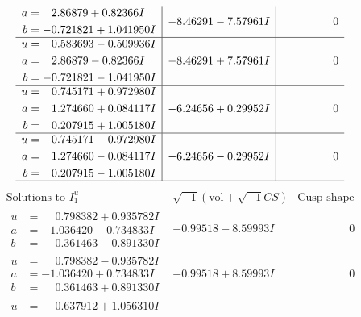 \documentclass[1p]{elsarticle_modified}
\theoremstyle{definition}
\newcommand{\I}{\sqrt{-1}}
\begin{document}
$$\begin{array}{c|c|c}
\begin{aligned}
a &= \phantom{-}2.86879 + 0.82366 I \\
b &= -0.721821 + 1.041950 I\end{aligned}
 & -8.46291 - 7.57961 I & \phantom{-0.000000 } 0 \\ \hline\begin{aligned}
u &= \phantom{-}0.583693 - 0.509936 I \\
a &= \phantom{-}2.86879 - 0.82366 I \\
b &= -0.721821 - 1.041950 I\end{aligned}
 & -8.46291 + 7.57961 I & \phantom{-0.000000 } 0 \\ \hline\begin{aligned}
u &= \phantom{-}0.745171 + 0.972980 I \\
a &= \phantom{-}1.274660 + 0.084117 I \\
b &= \phantom{-}0.207915 + 1.005180 I\end{aligned}
 & -6.24656 + 0.29952 I & \phantom{-0.000000 } 0 \\ \hline\begin{aligned}
u &= \phantom{-}0.745171 - 0.972980 I \\
a &= \phantom{-}1.274660 - 0.084117 I \\
b &= \phantom{-}0.207915 - 1.005180 I\end{aligned}
 & -6.24656 - 0.29952 I & \phantom{-0.000000 } 0\\
 \hline 
 \end{array}$$\newpage$$\begin{array}{c|c|c}  
\text{Solutions to }I^u_{1}& \I (\text{vol} + \sqrt{-1}CS) & \text{Cusp shape}\\
 \hline 
\begin{aligned}
u &= \phantom{-}0.798382 + 0.935782 I \\
a &= -1.036420 - 0.734833 I \\
b &= \phantom{-}0.361463 - 0.891330 I\end{aligned}
 & -0.99518 - 8.59993 I & \phantom{-0.000000 } 0 \\ \hline\begin{aligned}
u &= \phantom{-}0.798382 - 0.935782 I \\
a &= -1.036420 + 0.734833 I \\
b &= \phantom{-}0.361463 + 0.891330 I\end{aligned}
 & -0.99518 + 8.59993 I & \phantom{-0.000000 } 0 \\ \hline\begin{aligned}
u &= \phantom{-}0.637912 + 1.056310 I \\

\end{aligned}
\end{array}$$
\end{document}
